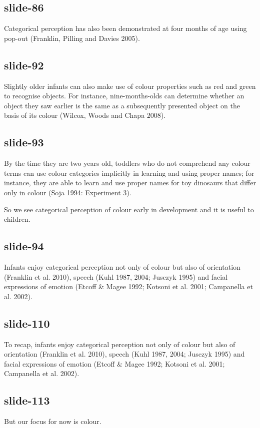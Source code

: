 \documentclass[12pt,\papersize]{extarticle}
\begin{document}
\subsection{slide-86}
Categorical perception has also been demonstrated at four months of age using pop-out (Franklin, Pilling and Davies 2005).
 
\subsection{slide-92}
Slightly older infants can also make use of colour properties such as red and green to recognise objects.  For instance, nine-months-olds can determine whether an object they saw earlier is the same as a subsequently presented object on the basis of its colour (Wilcox, Woods and Chapa 2008).
 
\subsection{slide-93}
By the time they are two years old, toddlers who do not comprehend any colour terms can use colour categories implicitly in learning and using proper names; for instance, they are able to learn and use proper names for toy dinosaurs that differ only in colour (Soja 1994: Experiment 3).
 
So we see categorical perception of colour early in development and it is useful to children.
 
\subsection{slide-94}
Infants enjoy categorical perception not only of colour but also of orientation (Franklin et al. 2010), speech (Kuhl 1987, 2004; Jusczyk 1995) and facial expressions of emotion (Etcoff \& Magee 1992; Kotsoni et al. 2001; Campanella et al. 2002).
 
\subsection{slide-110}
To recap, infants enjoy categorical perception not only of colour but also of orientation (Franklin et al. 2010), speech (Kuhl 1987, 2004; Jusczyk 1995) and facial expressions of emotion (Etcoff \& Magee 1992; Kotsoni et al. 2001; Campanella et al. 2002).
 
\subsection{slide-113}
But our focus for now is colour.
 
\end{document}
